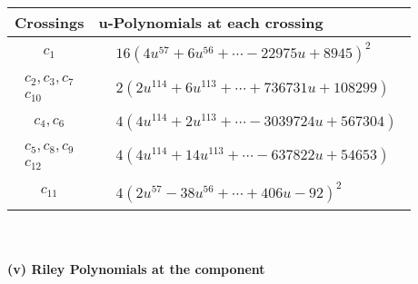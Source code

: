 \documentclass[1p]{elsarticle_modified}
\theoremstyle{definition}
\begin{document}
\begin{tabular}{m{50pt}|m{274pt}}
Crossings & \hspace{64pt}u-Polynomials at each crossing \\
\hline $$\begin{aligned}c_{1}\end{aligned}$$&$\begin{aligned}
&16(4 u^{57}+6 u^{56}+\cdots-22975 u+8945)^{2}
\end{aligned}$\\
\hline $$\begin{aligned}c_{2},c_{3},c_{7}\\c_{10}\end{aligned}$$&$\begin{aligned}
&2(2 u^{114}+6 u^{113}+\cdots+736731 u+108299)
\end{aligned}$\\
\hline $$\begin{aligned}c_{4},c_{6}\end{aligned}$$&$\begin{aligned}
&4(4 u^{114}+2 u^{113}+\cdots-3039724 u+567304)
\end{aligned}$\\
\hline $$\begin{aligned}c_{5},c_{8},c_{9}\\c_{12}\end{aligned}$$&$\begin{aligned}
&4(4 u^{114}+14 u^{113}+\cdots-637822 u+54653)
\end{aligned}$\\
\hline $$\begin{aligned}c_{11}\end{aligned}$$&$\begin{aligned}
&4(2 u^{57}-38 u^{56}+\cdots+406 u-92)^{2}
\end{aligned}$\\
\hline
\end{tabular}\\~\\
\newpage\renewcommand{\arraystretch}{1}
\flushleft \textbf{(v) Riley Polynomials at the component}\newline \\
\end{document}
